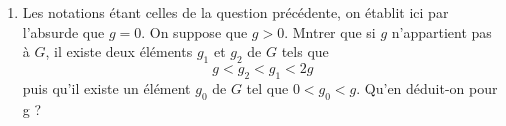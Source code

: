 \begin{enumerate}
\item Les notations étant celles de la question précédente, on établit ici par l'absurde que $g=0$. \newline
On suppose que $g>0$. Mntrer que si $g$ n'appartient pas à $G$, il existe deux éléments $g_1$ et $g_2$ de $G$ tels que
\[g<g_2 < g_1 < 2g\]
puis qu'il existe un élément $g_0$ de $G$ tel que $0< g_0 < g$. Qu'en déduit-on pour g ?
\end{enumerate} 
